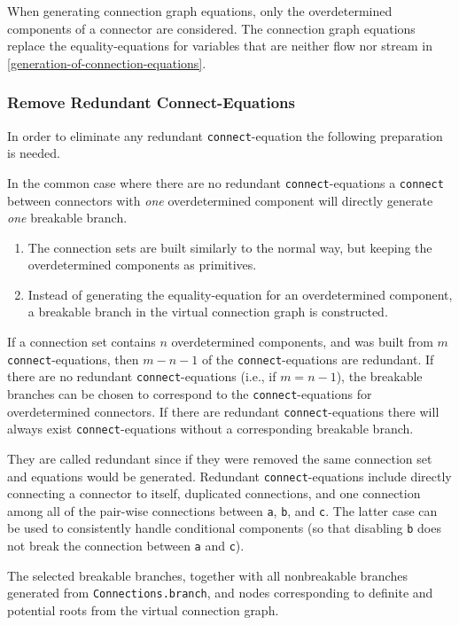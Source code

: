 When generating connection graph equations, only the overdetermined components of a connector are considered.
The connection graph equations replace the equality-equations for variables that are neither flow nor stream in \cref{generation-of-connection-equations}.

\subsubsection{Remove Redundant Connect-Equations}
In order to eliminate any redundant \lstinline!connect!-equation the following preparation is needed.
\begin{nonnormative}
In the common case where there are no redundant \lstinline!connect!-equations a \lstinline!connect! between connectors with \emph{one} overdetermined component will directly generate \emph{one} breakable branch.
\end{nonnormative}
\begin{enumerate}
\item
  The connection sets are built similarly to the normal way, but keeping the overdetermined components as primitives.
\item
  Instead of generating the equality-equation for an overdetermined component, a breakable branch in the virtual connection graph is constructed.
\end{enumerate}
If a connection set contains $n$ overdetermined components, and was built from $m$ \lstinline!connect!-equations, then $m-n-1$ of the \lstinline!connect!-equations are redundant.
If there are no redundant \lstinline!connect!-equations (i.e., if $m=n-1$), the breakable branches can be chosen to correspond to the \lstinline!connect!-equations for overdetermined connectors.
If there are redundant \lstinline!connect!-equations there will always exist \lstinline!connect!-equations without a corresponding breakable branch.
\begin{nonnormative}
They are called redundant since if they were removed the same connection set and equations would be generated.
Redundant \lstinline!connect!-equations include directly connecting a connector to itself, duplicated connections, and one connection among all of the pair-wise connections between \lstinline!a!, \lstinline!b!, and \lstinline!c!.
The latter case can be used to consistently handle conditional components (so that disabling \lstinline!b! does not break the connection between \lstinline!a! and \lstinline!c!).
\end{nonnormative}
The selected breakable branches, together with all nonbreakable branches generated from \lstinline!Connections.branch!, and nodes corresponding to definite and potential roots from the virtual connection graph.

